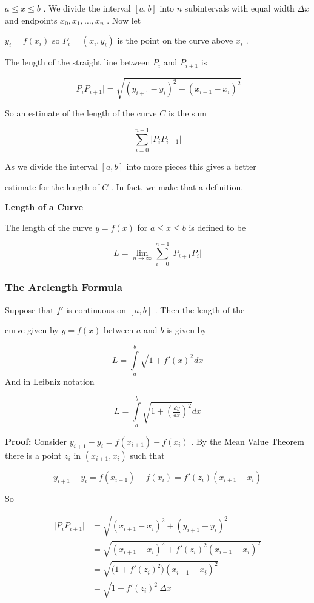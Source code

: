 $a\le x\le b$ . We divide the interval $[a,b]$ into $n$ subintervals with equal width $\Delta x$ and endpoints $x_0,x_1,\ldots,x_n$ . Now let

$y_i=f(x_i)$ so $P_i=(x_i,y_i)$ is the point on the curve above $x_i$ .

The length of the straight line between $P_i$ and $P _{i+1}$ is


\[
\bigl|P_iP _{i+1}\bigr|=\sqrt{(y _{i+1}-y_i)^2+(x _{i+1}-x_i)^2}
\]


So an estimate of the length of the curve $C$ is the sum


\[
\sum _{i=0}^{n-1}\bigl|P_iP _{i+1}\bigr|
\]


As we divide the interval $[a,b]$ into more pieces this gives a better

estimate for the length of $C$ . In fact, we make that a definition.


\textbf{Length of a Curve}


The length of the curve $y=f(x)$ for $a\le x\le b$ is defined to be


\[
L=\lim _{n\to\infty}\sum _{i=0}^{n-1}\bigl|P _{i+1}P_i\bigr|
\]


\subsubsection{The Arclength Formula}
\label{sss:thea-fcc9}


Suppose that $f'$ is continuous on $[a,b]$ . Then the length of the

curve given by $y=f(x)$ between $a$ and $b$ is given by


\[
L=\int\limits_a^b \sqrt{1+f'(x)^2}dx
\] And in Leibniz notation


\[
L=\int\limits_a^b \sqrt{1+\left(\tfrac{dy}{dx}\right)^2}dx
\]


\textbf{Proof:} Consider $y _{i+1}-y_i=f(x _{i+1})-f(x_i)$ . By the Mean Value Theorem there is a point $z_i$ in $(x _{i+1},x_i)$ such that


\[
y _{i+1}-y_i=f(x _{i+1})-f(x_i)=f'(z_i)(x _{i+1}-x_i)
\]


So


\begin{align}
\bigl|P_iP _{i+1}\bigr| &= \sqrt{(x _{i+1} - x_i)^2 + (y _{i+1} - y_i)^2} \\&= \sqrt{(x _{i+1} - x_i)^2 + f'(z_i)^2(x _{i+1} - x_i)^2} \\&= \sqrt{\bigl(1 + f'(z_i)^2\bigr)(x _{i+1} - x_i)^2} \\&= \sqrt{1 + f'(z_i)^2} \,\Delta x
\end{align}


